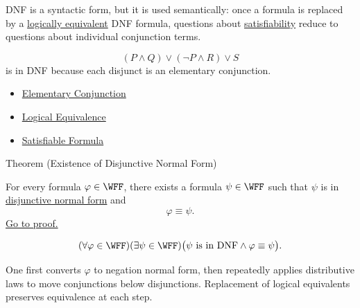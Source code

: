 \begin{remark*}[Interpretation]
DNF is a syntactic form, but it is used semantically: once a formula is replaced
by a \hyperref[def:logical-equivalence-propositional-logic]{logically equivalent}
DNF formula, questions about
\hyperref[def:satisfiable-formula-propositional-logic]{satisfiability} reduce
to questions about individual conjunction terms.
\end{remark*}

\begin{example*}[Examples]
\[
(P\land Q)\lor(\neg P\land R)\lor S
\]
is in DNF because each disjunct is an elementary conjunction.
\end{example*}

\begin{dependencies}
\begin{itemize}
  \item \hyperref[def:elementary-conjunction-propositional-logic]{Elementary Conjunction}
  \item \hyperref[def:logical-equivalence-propositional-logic]{Logical Equivalence}
  \item \hyperref[def:satisfiable-formula-propositional-logic]{Satisfiable Formula}
\end{itemize}
\end{dependencies}

\begin{theorembox}{Theorem (Existence of Disjunctive Normal Form)}
\begin{theorem}
\label{thm:existence-disjunctive-normal-form-propositional-logic}
For every formula \(\varphi\in\WFF\), there exists a formula
\(\psi\in\WFF\) such that \(\psi\) is in
\hyperref[def:disjunctive-normal-form-propositional-logic]{disjunctive normal form}
and
\[
\varphi\equiv\psi.
\]
\noindent\hyperref[prf:existence-disjunctive-normal-form-propositional-logic]{Go to proof.}
\end{theorem}
\end{theorembox}
\begin{remark*}
\[
(\forall\varphi\in\WFF)(\exists\psi\in\WFF)
\bigl(\psi\text{ is in DNF}\land \varphi\equiv\psi\bigr).
\]
\end{remark*}




\begin{remark*}[Interpretation]
One first converts \(\varphi\) to negation normal form, then repeatedly applies
distributive laws to move conjunctions below disjunctions. Replacement of
logical equivalents preserves equivalence at each step.
\end{remark*}

